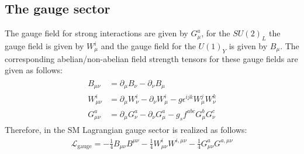 \subsection{The gauge sector}
The gauge field for strong interactions are given by $G_{\mu}^a$, for the $SU(2)_L$ the gauge field is given by $W_{\mu}^i$ and the gauge field for the $U(1)_Y$ is given by $B_{\mu}$. The corresponding abelian/non-abelian field strength tensors for these gauge fields are given as follows:
\begin{eqnarray}\label{GaugeFieldStreangth}
\begin{aligned} B_{\mu \nu} &=\partial_{\mu} B_{\nu}-\partial_{\nu} B_{\mu} \\ W_{\mu \nu}^{i} &=\partial_{\mu} W_{\nu}^{i}-\partial_{\nu} W_{\mu}^{i}-g \epsilon^{i j k} W_{\mu}^{j} W_{\nu}^{k} \\ G_{\mu \nu}^{a} &=\partial_{\mu} G_{\nu}^{a}-\partial_{\nu} G_{\mu}^{a}-g_{s} f^{a b c} G_{\mu}^{b} G_{\nu}^{c} \end{aligned}
\end{eqnarray}
Therefore, in the SM Lagrangian gauge sector is realized as follows:
\begin{eqnarray}
\mathcal{L}_{\mathrm{gauge}}=-\frac{1}{4} B_{\mu \nu} B^{\mu \nu}-\frac{1}{4} W_{\mu \nu}^{i} W^{i, \mu \nu}-\frac{1}{4} G_{\mu \nu}^{a} G^{a, \mu \nu}
\end{eqnarray}
